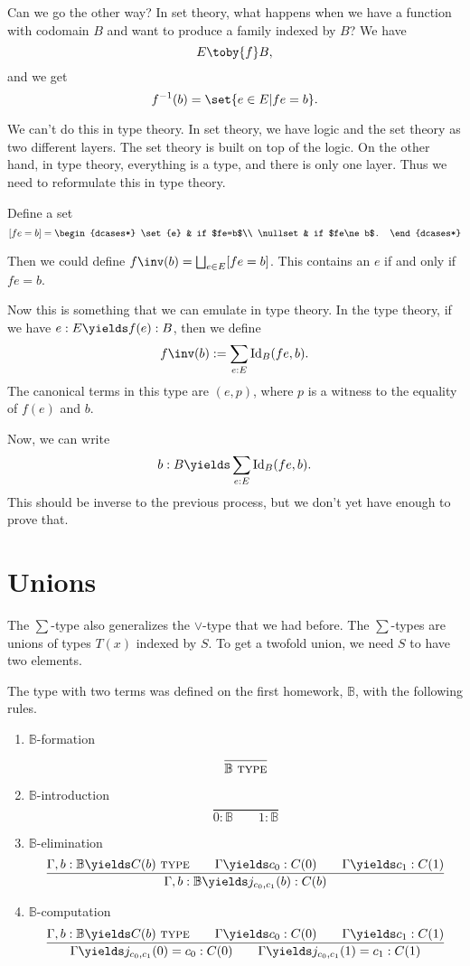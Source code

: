\documentclass{article}
\newcommand\TYPE{\text{ \scshape{type}}}
\newcommand\IdT{\mathrm{Id}}
\newcommand\BB{\mathbb{B}}
\begin{document}
Can we go the other way?
In set theory, what happens when we have a
function with codomain $B$ and want to produce a family indexed
by $B$?
We have 
\[E\toby{f} B,\]
and we get 
\[f^{-1}(b) =\set{e\in E|fe=b}.\]

We can't do this in type theory. In set theory, we have logic 
and the set theory as two different layers. The set theory is 
built on top of the logic. On the other hand, in type theory,
everything is a type, and there is only one layer.
Thus we need to reformulate this in type theory.

Define a set
\[ [fe=b] =\begin{dcases*}
    \set{e} & if $fe=b$\\
    \nullset & if $fe\ne b$.
\end{dcases*}
\]

Then we could define $f\inv(b) = \bigsqcup_{e\in E} [fe=b]$.
This contains an $e$ if and only if $fe=b$.

Now this is something that we can emulate in type theory.
In the type theory, if we have 
$e:E\yields f(e):B$, then we define 
\[f\inv(b) := \sum_{e:E} \IdT_B(f e,b).\]
The canonical terms in this type are 
$(e,p)$, where $p$ is a witness to the equality of $f(e)$ and $b$.

Now, we can write 
\[b:B\yields \sum_{e:E} \IdT_B(f e,b). \]
This should be inverse to the previous process, but we don't 
yet have enough to prove that.

\section{Unions}

The $\sum$-type also generalizes the $\vee$-type that we had 
before. The $\sum$-types are unions of types $T(x)$ indexed 
by $S$. To get a twofold union, we need $S$ to have two elements.

The type with two terms was defined on the first homework,
$\BB$, with the following rules.

\begin{enumerate}
    \item $\BB$-formation
        \[ \frac{}{\BB\TYPE}\]
    \item $\BB$-introduction
        \[\frac{}{0:\BB\qquad 1:\BB}\]
    \item $\BB$-elimination
        \[\frac{
            \Gamma,b:\BB\yields C(b)\TYPE 
            \qquad
            \Gamma\yields c_0:C(0)
            \qquad
            \Gamma\yields c_1:C(1)
        }{
            \Gamma,b:\BB\yields j_{c_0,c_1}(b):C(b)
        }
        \]
    \item $\BB$-computation 
        \[\frac{
            \Gamma,b:\BB\yields C(b)\TYPE 
            \qquad
            \Gamma\yields c_0:C(0)
            \qquad
            \Gamma\yields c_1:C(1)
        }{
            \Gamma\yields j_{c_0,c_1}(0)=c_0:C(0)
            \qquad
            \Gamma\yields j_{c_0,c_1}(1)=c_1:C(1)
        }
        \]
\end{enumerate}
\end{document}
